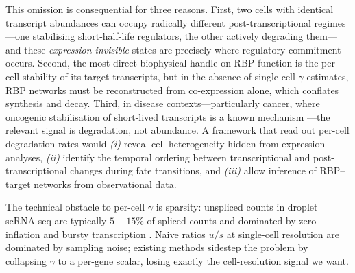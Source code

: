 \documentclass{article}
\begin{document}
This omission is consequential for three reasons. First, two cells with
identical transcript abundances can occupy radically different
post-transcriptional regimes---one stabilising short-half-life regulators, the
other actively degrading them---and these \emph{expression-invisible} states
are precisely where regulatory commitment occurs. Second, the most direct
biophysical handle on RBP function is the per-cell stability of its target
transcripts, but in the absence of single-cell $\gamma$ estimates, RBP networks
must be reconstructed from co-expression alone, which conflates synthesis and
decay. Third, in disease contexts---particularly cancer, where oncogenic
stabilisation of short-lived transcripts is a known mechanism
\citep{dempster2021}---the relevant signal is degradation, not abundance. A
framework that read out per-cell degradation rates would
\emph{(i)} reveal cell heterogeneity hidden from expression analyses,
\emph{(ii)} identify the temporal ordering between transcriptional and
post-transcriptional changes during fate transitions, and
\emph{(iii)} allow inference of RBP--target networks from observational data.

The technical obstacle to per-cell $\gamma$ is sparsity: unspliced counts in
droplet scRNA-seq are typically $5{-}15\%$ of spliced counts and dominated by
zero-inflation and bursty transcription \citep{bergen2020}. Naive ratios
$u/s$ at single-cell resolution are dominated by sampling noise; existing
methods sidestep the problem by collapsing $\gamma$ to a per-gene scalar,
losing exactly the cell-resolution signal we want.
\end{document}
